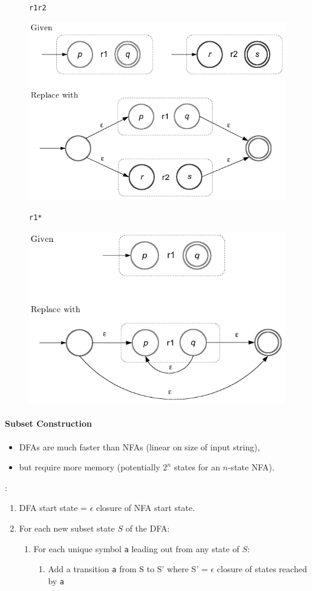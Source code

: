 \documentclass[twocolumn,english]{article}
\let\emph\relax
\begin{document}
\begin{figure}[H]
\begin{centering}
\texttt{r1\textbar{}r2} 
\par\end{centering}

\centering{}\includegraphics[width=0.5\linewidth]{img/alternate} 
\end{figure}


\begin{figure}[H]
\begin{centering}
\texttt{r1{*}} 
\par\end{centering}

\centering{}\includegraphics[width=0.5\linewidth]{img/repeat} 
\end{figure}



\paragraph{Subset Construction}
\begin{itemize}
\item DFAs are much faster than NFAs (linear on size of input string), 
\item but require more memory (potentially $2^{n}$ states for an $n$-state
NFA). 
\end{itemize}
\emph{Algorithm}: 
\begin{enumerate}
\item DFA start state = $\epsilon$ closure of NFA start state. 
\item For each new subset state $S$ of the DFA: 

\begin{enumerate}
\item For each unique symbol \texttt{a} leading out from any state of $S$: 

\begin{enumerate}
\item Add a transition \texttt{a} from S to S' where S' = $\epsilon$ closure
of states reached by \texttt{a} 
\end{enumerate}
\end{enumerate}
\end{enumerate}
\end{document}
